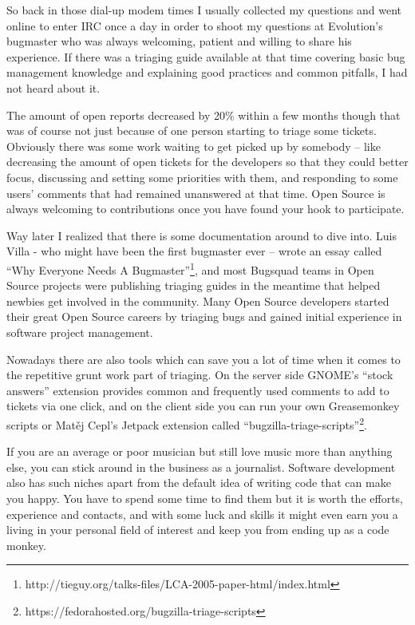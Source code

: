 So back in those dial-up modem times I usually collected my questions and went
online to enter IRC once a day in order to shoot my questions at Evolution's
bugmaster who was always welcoming, patient and willing to share his experience.
If there was a triaging guide available at that time covering basic bug
management knowledge and explaining good practices and common pitfalls, I had
not heard about it.

The amount of open reports decreased by 20\% within a few months though that was
of course not just because of one person starting to triage some tickets.
Obviously there was some work waiting to get picked up by somebody -- like
decreasing the amount of open tickets for the developers so that they could
better focus, discussing and setting some priorities with them, and responding
to some users' comments that had remained unanswered at that time. Open Source
is always welcoming to contributions once you have found your hook to
participate.

Way later I realized that there is some documentation around to dive into. Luis
Villa - who might have been the first bugmaster ever -- wrote an essay called
``Why Everyone Needs A Bugmaster''\footnote{{
http://tieguy.org/talks-files/LCA-2005-paper-html/index.html}}, and most
Bugsquad teams in Open Source projects were publishing triaging guides in the
meantime that helped newbies get involved in the community. Many Open Source
developers started their great Open Source careers by triaging bugs and gained
initial experience in software project management.

Nowadays there are also tools which can save you a lot of time when it comes to
the repetitive grunt work part of triaging. On the server side GNOME's ``stock
answers'' extension provides common and frequently used comments to add to
tickets via one click, and on the client side you can run your own Greasemonkey
scripts or Matěj Cepl's Jetpack extension called
``bugzilla-triage-scripts''\footnote{{
https://fedorahosted.org/bugzilla-triage-scripts}}.

If you are an average or poor musician but still love music more than anything
else, you can stick around in the business as a journalist. Software development also has such niches apart from the default idea of writing code that can make you happy. You have to spend some time to find them but it is worth the efforts, experience and contacts, and with some luck and skills it might even earn you a living in your personal field of interest and keep you from ending up as a code monkey.
